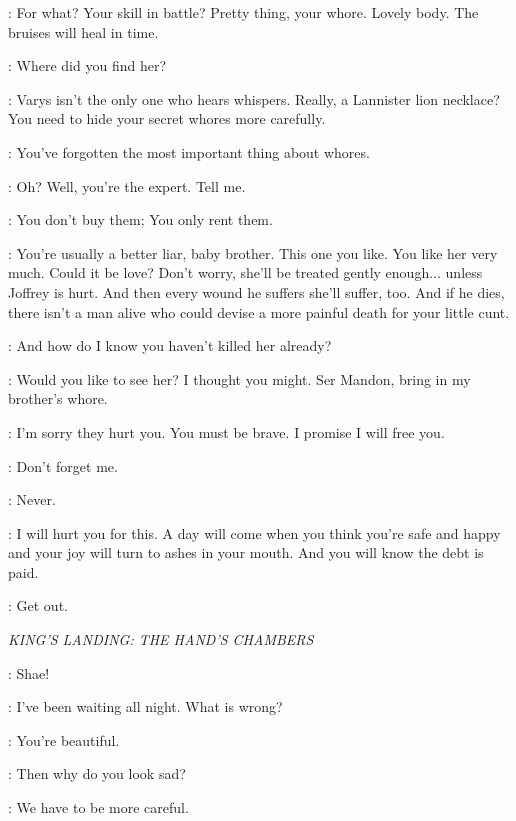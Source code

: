 \CERSEI: For what? Your skill in battle? Pretty thing, your whore. Lovely body. The bruises will heal in time. 

\TYRION: Where did you find her? 

\CERSEI: Varys isn't the only one who hears whispers. Really, a Lannister lion necklace? You need to hide your secret whores more carefully. 

\TYRION: You've forgotten the most important thing about whores. 

\CERSEI: Oh? Well, you're the expert. Tell me. 

\TYRION: You don't buy them; You only rent them. 

\CERSEI: You're usually a better liar, baby brother. This one you like. You like her very much. Could it be love? Don't worry, she'll be treated gently enough$\ldots$ unless Joffrey is hurt. And then every wound he suffers she'll suffer, too. And if he dies, there isn't a man alive who could devise a more painful death for your little cunt. 

\TYRION: And how do I know you haven't killed her already? 

\CERSEI: Would you like to see her? I thought you might. Ser Mandon, bring in my brother's whore. 


\TYRION: I'm sorry they hurt you. You must be brave. I promise I will free you. 

\ROS: Don't forget me. 

\TYRION: Never. 


\TYRION: I will hurt you for this. A day will come when you think you're safe and happy and your joy will turn to ashes in your mouth. And you will know the debt is paid. 

\CERSEI: Get out. 


\scene

\textit{KING'S LANDING: THE HAND'S CHAMBERS} 


\TYRION: Shae! 

\SHAE: I've been waiting all night. What is wrong? 

\TYRION: You're beautiful. 

\SHAE: Then why do you look sad? 

\TYRION: We have to be more careful. 

